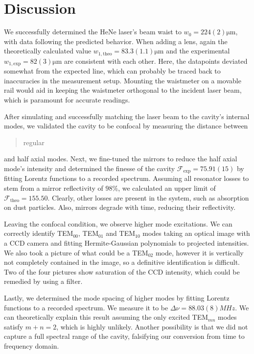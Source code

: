 \section{Discussion}
We successfully determined the HeNe laser's beam waist to $w_0 = 224(2) \unit{\micro\m}$, with data following the predicted behavior. When adding a lens, again the theoretically calculated value $w_{1, \mathrm{theo}} = 83.3(1.1) \unit{\micro\m}$ and the experimental $w_{1,\mathrm{exp}} = 82(3) \unit{\micro\m}$ are consistent with each other. Here, the datapoints deviated somewhat from the expected line, which can probably be traced back to inaccuracies in the measurement setup. Mounting the waistmeter on a movable rail would aid in keeping the waistmeter orthogonal to the incident laser beam, which is paramount for accurate readings. 

After simulating and successfully matching the laser beam to the cavity's internal modes, we validated the cavity to be confocal by measuring the distance between \blockquote{regular} and half axial modes. Next, we fine-tuned the mirrors to reduce the half axial mode's intensity and determined the finesse of the cavity $\mathcal{F}_{\text{exp}} = 75.91(15)$ by fitting Lorentz functions to a recorded spectrum. Assuming all resonator losses to stem from a mirror reflectivity of $98 \%$, we calculated an upper limit of $\mathcal{F}_{\text{theo}} = 155.50$. Clearly, other losses are present in the system, such as absorption on dust particles. Also, mirrors degrade with time, reducing their reflectivity.

Leaving the confocal condition, we observe higher mode excitations. We can correctly identify TEM$_{00}$, TEM$_{01}$ and TEM$_{10}$ modes taking an optical image with a CCD camera and fitting Hermite-Gaussian polynomials to projected intensities. We also took a picture of what could be a TEM$_{02}$ mode, however it is vertically not completely contained in the image, so a definitive identification is difficult. Two of the four pictures show saturation of the CCD intensity, which could be remedied by using a filter.

Lastly, we determined the mode spacing of higher modes by fitting Lorentz functions to a recorded spectrum. We measure it to be $\Delta\nu = 88.03(8) \unit{MHz}$. We can theoretically explain this result assuming the only excited TEM$_{mn}$ modes satisfy $m + n = 2$, which is highly unlikely. Another possibility is that we did not capture a full spectral range of the cavity, falsifying our conversion from time to frequency domain. 